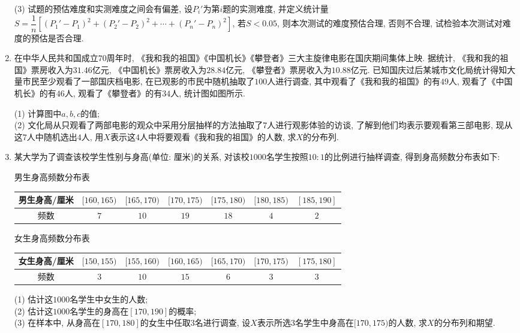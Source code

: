 \documentclass[10pt,a4paper]{article}
\begin{document}
\begin{enumerate}[1.]
(3) 试题的预估难度和实测难度之间会有偏差, 设$P_i'$为第$i$题的实测难度, 并定义统计量$S=\dfrac 1n[(P_1'-P_1)^2+(P_2'-P_2)^2+\cdots+(P_n'-P_n)^2]$, 若$S<0.05$, 则本次测试的难度预估合理, 否则不合理, 试检验本次测试对难度的预估是否合理.
\item 在中华人民共和国成立$70$周年时, 《我和我的祖国》《中国机长》《攀登者》三大主旋律电影在国庆期间集体上映. 据统计, 《我和我的祖国》票房收入为$31.46$亿元, 《中国机长》票房收入为$28.84$亿元, 《攀登者》票房收入为$10.88$亿元. 已知国庆过后某城市文化局统计得知大量市民至少观看了一部国庆档电影, 在已观影的市民中随机抽取了$100$人进行调查, 其中观看了《我和我的祖国》的有$49$人, 观看了《中国机长》的有$46$人, 观看了《攀登者》的有$34$人, 统计图如图所示.
\begin{center}
\end{center}
(1) 计算图中$a, b, c$的值;\\
(2) 文化局从只观看了两部电影的观众中采用分层抽样的方法抽取了$7$人进行观影体验的访谈, 了解到他们均表示要观看第三部电影, 现从这$7$人中随机选出$4$人, 用$X$表示这$4$人中将要观看《我和我的祖国》的人数, 求$X$的分布列.
\item 某大学为了调查该校学生性别与身高(单位: 厘米)的关系, 对该校$1000$名学生按照$10:1$的比例进行抽样调查, 得到身高频数分布表如下:
\begin{center}
男生身高频数分布表
    \begin{tabular}{|c|c|c|c|c|c|c|}
        \hline 
        男生身高/厘米 & $[160,165)$ & $[165,170)$ & $[170,175)$ & $[175,180)$ & $[180,185)$ & $[185,190]$\\ \hline
        频数 & $7$ & $10$ & $19$ & $18$	& $4$ & $2$\\ \hline
    \end{tabular}
\end{center}
\begin{center}
    女生身高频数分布表
    \begin{tabular}{|c|c|c|c|c|c|c|}
        \hline 
        女生身高/厘米 &  $[150,155)$ & $[155,160)$ & $[160,165)$ & $[165,170)$ & $[170,175)$ & $[175,180]$ \\ \hline
        频数 & $3$ & $10$ & $15$ & $6$	& $3$ & $3$\\ \hline
    \end{tabular}
 \end{center}
(1) 估计这$1000$名学生中女生的人数;\\
(2) 估计这$1000$名学生的身高在$[170, 190]$的概率;\\
(3) 在样本中, 从身高在$[170, 180]$的女生中任取$3$名进行调查, 设$X$表示所选$3$名学生中身高在$[170, 175)$的人数, 求$X$的分布列和期望.

\end{enumerate}
\end{document}
